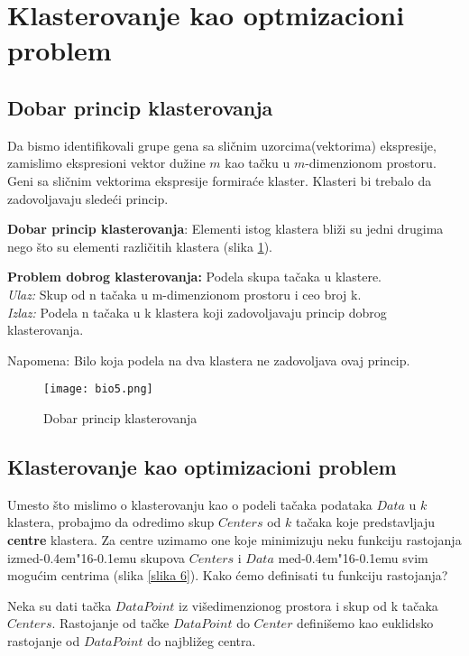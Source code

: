 \documentclass[a4paper]{book}
\def \dj {d\kern-0.4em\char"16\kern-0.1em}
\begin{document}
\section{Klasterovanje kao optmizacioni problem}
\subsection{Dobar princip klasterovanja}
Da bismo identifikovali grupe gena sa sličnim uzorcima(vektorima) ekspresije, zamislimo ekspresioni vektor dužine $m$ kao tačku u $m$-dimenzionom prostoru. Geni sa sličnim vektorima ekspresije 
formiraće klaster. Klasteri bi trebalo da zadovoljavaju sledeći princip.

\textbf{Dobar princip klasterovanja}: Elementi istog klastera bliži su jedni drugima nego što su elementi različitih klastera (slika \ref{slika 5}).

\begin{tcolorbox}
\textbf{Problem dobrog klasterovanja:} Podela skupa tačaka u klastere.\\
\textit{Ulaz:} Skup od n tačaka u m-dimenzionom prostoru i ceo broj k.\\
\textit{Izlaz:} Podela n tačaka u k klastera koji zadovoljavaju princip dobrog klasterovanja.
\end{tcolorbox}

\noindent Napomena: Bilo koja podela na dva klastera ne zadovoljava ovaj princip.
\begin{figure}[h]
    \centering
    \texttt{[image: bio5.png]}
    \caption{Dobar princip klasterovanja}
    \label{slika 5}
\end{figure}

\subsection{Klasterovanje kao optimizacioni problem}

Umesto što mislimo o klasterovanju kao o podeli tačaka podataka $Data$ u $k$ klastera, probajmo da odredimo skup $Centers$ od $k$ tačaka koje predstavljaju \textbf{centre} klastera. Za centre uzimamo one koje minimizuju neku funkciju rastojanja izme\dj u skupova $Centers$ i $Data$ me\dj u svim mogućim centrima (slika \ref{slika 6}). Kako ćemo definisati tu funkciju rastojanja?

Neka su dati tačka $DataPoint$ iz višedimenzionog prostora i skup od k tačaka $Centers$. Rastojanje od tačke $DataPoint$ do $Center$ definišemo kao euklidsko rastojanje od $DataPoint$ do najbližeg centra.
\end{document}
